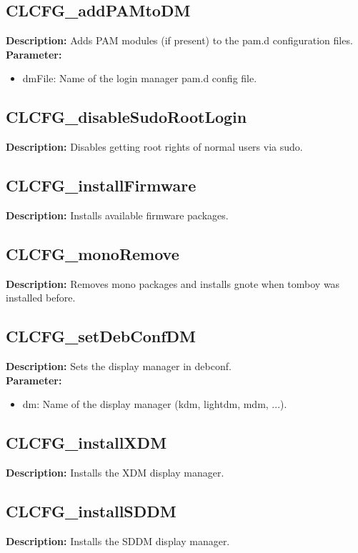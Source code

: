 \subsection{CLCFG\_addPAMtoDM}
\textbf{Description:} Adds PAM modules (if present) to the pam.d configuration files.\\
\textbf{Parameter:}
\begin{itemize}
\item dmFile: Name of the login manager pam.d config file.
\end{itemize}

\subsection{CLCFG\_disableSudoRootLogin}
\textbf{Description:} Disables getting root rights of normal users via sudo.\\

\subsection{CLCFG\_installFirmware}
\textbf{Description:} Installs available firmware packages.\\

\subsection{CLCFG\_monoRemove}
\textbf{Description:} Removes mono packages and installs gnote when tomboy was installed before.\\

\subsection{CLCFG\_setDebConfDM}
\textbf{Description:} Sets the display manager in debconf.\\
\textbf{Parameter:}
\begin{itemize}
\item dm: Name of the display manager (kdm, lightdm, mdm, ...).
\end{itemize}

\subsection{CLCFG\_installXDM}
\textbf{Description:} Installs the XDM display manager.\\

\subsection{CLCFG\_installSDDM}
\textbf{Description:} Installs the SDDM display manager.\\

